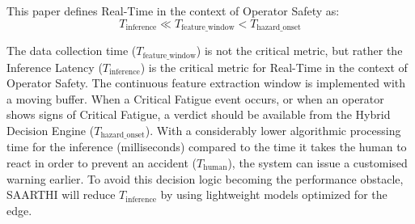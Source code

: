 This paper defines Real-Time in the context of Operator Safety as:
\begin{equation}
    T_{\text{inference}} \ll T_{\text{feature\_window}} < T_{\text{hazard\_onset}}
\end{equation}

The data collection time ($T_{\text{feature\_window}}$) is not the critical metric, but rather the Inference Latency ($T_{\text{inference}}$) is the critical metric for Real-Time in the context of Operator Safety. The continuous feature extraction window is implemented with a moving buffer. When a Critical Fatigue event occurs, or when an operator shows signs of Critical Fatigue, a verdict should be available from the Hybrid Decision Engine ($T_{\text{hazard\_onset}}$). With a considerably lower algorithmic processing time for the inference (milliseconds) compared to the time it takes the human to react in order to prevent an accident ($T_{\text{human}}$), the system can issue a customised warning earlier. To avoid this decision logic becoming the performance obstacle, SAARTHI will reduce $T_{\text{inference}}$ by using lightweight models optimized for the edge.
